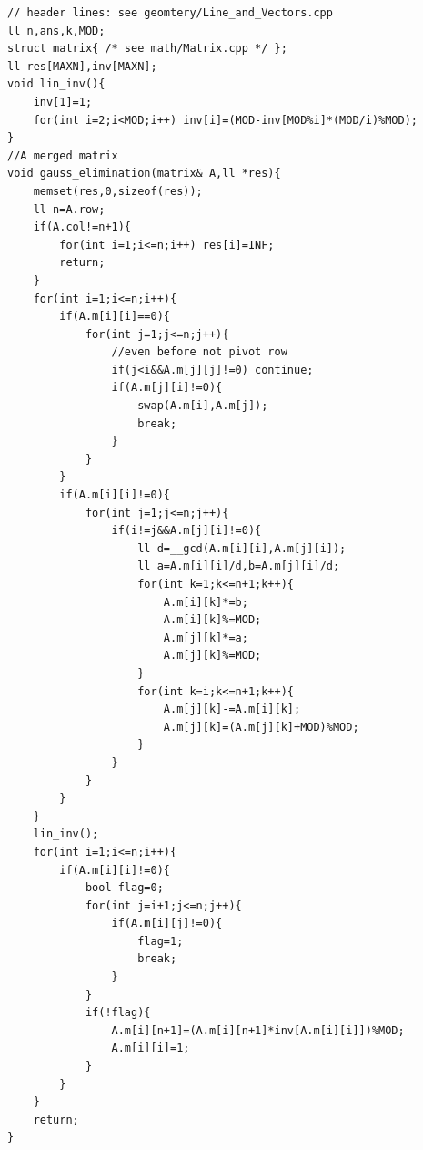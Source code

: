 
\begin{lstlisting}[breaklines=true]
// header lines: see geomtery/Line_and_Vectors.cpp
ll n,ans,k,MOD;
struct matrix{ /* see math/Matrix.cpp */ };
ll res[MAXN],inv[MAXN];
void lin_inv(){
    inv[1]=1;
    for(int i=2;i<MOD;i++) inv[i]=(MOD-inv[MOD%i]*(MOD/i)%MOD);
}
//A merged matrix
void gauss_elimination(matrix& A,ll *res){
    memset(res,0,sizeof(res));
    ll n=A.row;
    if(A.col!=n+1){
        for(int i=1;i<=n;i++) res[i]=INF;
        return;
    }
    for(int i=1;i<=n;i++){
        if(A.m[i][i]==0){
            for(int j=1;j<=n;j++){
                //even before not pivot row
                if(j<i&&A.m[j][j]!=0) continue;
                if(A.m[j][i]!=0){
                    swap(A.m[i],A.m[j]);
                    break;
                }
            }
        }
        if(A.m[i][i]!=0){
            for(int j=1;j<=n;j++){
                if(i!=j&&A.m[j][i]!=0){
                    ll d=__gcd(A.m[i][i],A.m[j][i]);
                    ll a=A.m[i][i]/d,b=A.m[j][i]/d;
                    for(int k=1;k<=n+1;k++){
                        A.m[i][k]*=b;
                        A.m[i][k]%=MOD;
                        A.m[j][k]*=a;
                        A.m[j][k]%=MOD;
                    }
                    for(int k=i;k<=n+1;k++){
                        A.m[j][k]-=A.m[i][k];
                        A.m[j][k]=(A.m[j][k]+MOD)%MOD;
                    }
                }
            }
        }
    }
    lin_inv();
    for(int i=1;i<=n;i++){
        if(A.m[i][i]!=0){
            bool flag=0;
            for(int j=i+1;j<=n;j++){
                if(A.m[i][j]!=0){
                    flag=1;
                    break;
                }
            }
            if(!flag){
                A.m[i][n+1]=(A.m[i][n+1]*inv[A.m[i][i]])%MOD;
                A.m[i][i]=1;
            }
        }
    }
    return;
}
\end{lstlisting}


